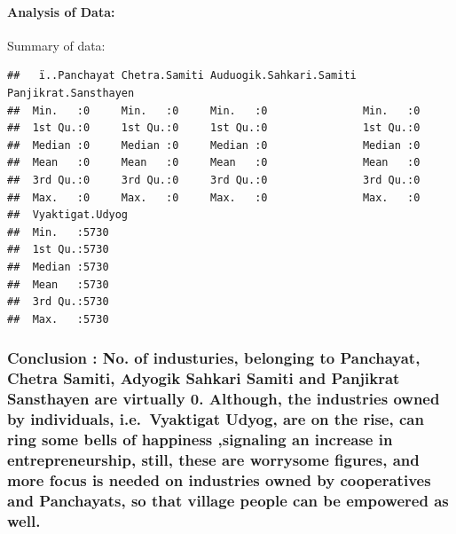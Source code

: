 \documentclass[]{article}
\let\oldparagraph\paragraph
\renewcommand{\paragraph}[1]{\oldparagraph{#1}\mbox{}}
\begin{document}
\paragraph{Analysis of Data:}\label{analysis-of-data-2}

Summary of data:

\begin{verbatim}
##   ï..Panchayat Chetra.Samiti Auduogik.Sahkari.Samiti Panjikrat.Sansthayen
##  Min.   :0     Min.   :0     Min.   :0               Min.   :0           
##  1st Qu.:0     1st Qu.:0     1st Qu.:0               1st Qu.:0           
##  Median :0     Median :0     Median :0               Median :0           
##  Mean   :0     Mean   :0     Mean   :0               Mean   :0           
##  3rd Qu.:0     3rd Qu.:0     3rd Qu.:0               3rd Qu.:0           
##  Max.   :0     Max.   :0     Max.   :0               Max.   :0           
##  Vyaktigat.Udyog
##  Min.   :5730   
##  1st Qu.:5730   
##  Median :5730   
##  Mean   :5730   
##  3rd Qu.:5730   
##  Max.   :5730
\end{verbatim}

\subsubsection{\texorpdfstring{\textbf{Conclusion} : No. of industuries,
belonging to Panchayat, Chetra Samiti, Adyogik Sahkari Samiti and
Panjikrat Sansthayen are virtually 0. Although, the industries owned by
individuals, i.e.~Vyaktigat Udyog, are on the rise, can ring some bells
of happiness ,signaling an increase in entrepreneurship, still, these
are worrysome figures, and more focus is needed on industries owned by
cooperatives and Panchayats, so that village people can be empowered as
well.}{Conclusion : No. of industuries, belonging to Panchayat, Chetra Samiti, Adyogik Sahkari Samiti and Panjikrat Sansthayen are virtually 0. Although, the industries owned by individuals, i.e.~Vyaktigat Udyog, are on the rise, can ring some bells of happiness ,signaling an increase in entrepreneurship, still, these are worrysome figures, and more focus is needed on industries owned by cooperatives and Panchayats, so that village people can be empowered as well.}}\label{conclusion-no.-of-industuries-belonging-to-panchayat-chetra-samiti-adyogik-sahkari-samiti-and-panjikrat-sansthayen-are-virtually-0.-although-the-industries-owned-by-individuals-i.e.vyaktigat-udyog-are-on-the-rise-can-ring-some-bells-of-happiness-signaling-an-increase-in-entrepreneurship-still-these-are-worrysome-figures-and-more-focus-is-needed-on-industries-owned-by-cooperatives-and-panchayats-so-that-village-people-can-be-empowered-as-well.}
\end{document}
